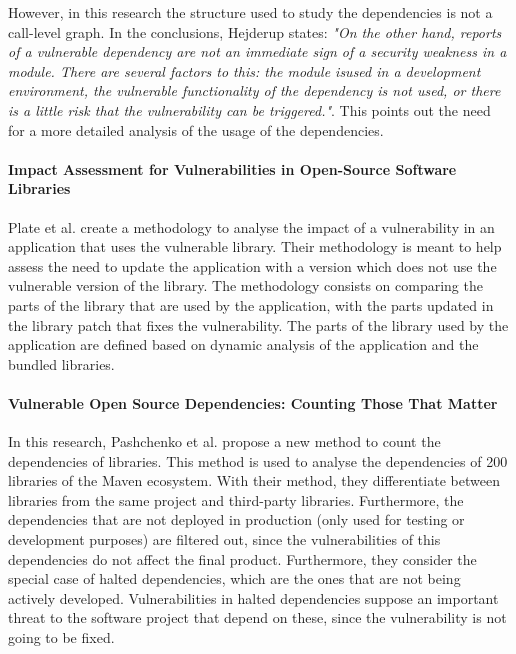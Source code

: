 However, in this research the structure used to study the dependencies is not a call-level graph. In the conclusions, Hejderup states: \textit{"On the other hand, reports of a vulnerable dependency are not an immediate sign of a security weakness in a module. There are several factors to this: the module isused in a development environment, the vulnerable functionality of the dependency is not used, or there is a little risk that the vulnerability can be triggered."}. This points out the need for a more detailed analysis of the usage of the dependencies.

\paragraph{Impact Assessment for Vulnerabilities in Open-Source Software Libraries \cite{plate2015impact}}
Plate et al. create a methodology to analyse the impact of a vulnerability in an application that uses the vulnerable library. Their methodology is meant to help assess the need to update the application with a version which does not use the vulnerable version of the library.
The methodology consists on comparing the parts of the library that are used by the application, with the parts updated in the library patch that fixes the vulnerability. The parts of the library used by the application are defined based on dynamic analysis of the application and the bundled libraries.

\paragraph{Vulnerable Open Source Dependencies: Counting Those That Matter \cite{pashchenko2018vulnerable}} %
In this research, Pashchenko et al. propose a new method to count the dependencies of libraries. This method is used to analyse the dependencies of 200 libraries of the Maven ecosystem. With their method, they differentiate between libraries from the same project and third-party libraries. Furthermore, the dependencies that are not deployed in production (only used for testing or development purposes) are filtered out, since the vulnerabilities of this dependencies do not affect the final product. Furthermore, they consider the special case of halted dependencies, which are the ones that are not being actively developed. Vulnerabilities in halted dependencies suppose an important threat to the software project that depend on these, since the vulnerability is not going to be fixed.

